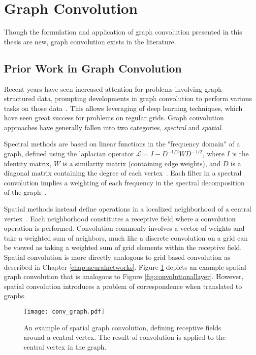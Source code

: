 \section{Graph Convolution}
Though the formulation and application of graph convolution presented in this thesis are new, graph convolution exists in the literature.


\subsection{Prior Work in Graph Convolution}
Recent years have seen increased attention for problems involving graph structured data, prompting developments in graph convolution to perform various tasks on those data~\cite{bronstein2016}.
This allows leveraging of deep learning techniques, which have seen great success for problems on regular grids.
Graph convolution approaches have generally fallen into two categories, \textit{spectral} and \textit{spatial}.

Spectral methods are based on linear functions in the "frequency domain" of a graph, defined using the laplacian operator $\mathcal{L}=I-D^{-1/2}WD^{-1/2}$, where $I$ is the identity matrix, $W$ is a similarity matrix (containing edge weights), and $D$ is a diagonal matrix containing the degree of each vertex~\cite{bruna2013, henaff2015, kipf2016}.
Each filter in a spectral convolution implies a weighting of each frequency in the spectral decomposition of the graph~\cite{mallat2009}.

Spatial methods instead define operations in a localized neighborhood of a central vertex~\cite{henaff2015, atwood2016}.
Each neighborhood constitutes a receptive field where a convolution operation is performed.
Convolution commonly involves a vector of weights and take a weighted sum of neighbors, much like a discrete convolution on a grid can be viewed as taking a weighted sum of grid elements within the receptive field.
Spatial convolution is more directly analogous to grid based convolution as described in Chapter \ref{chap:neuralnetworks}.
Figure \ref{fig:spatial_graph_conv} depicts an example spatial graph convolution that is analogous to Figure \ref{fig:convolutionallayer}.
However, spatial convolution introduces a problem of correspondence when translated to graphs.

\begin{figure}
	\centering
	\texttt{[image: conv\_graph.pdf]}
	\caption{An example of spatial graph convolution, defining receptive fields around a central vertex. The result of convolution is applied to the central vertex in the graph.}
	\label{fig:spatial_graph_conv}
\end{figure}

